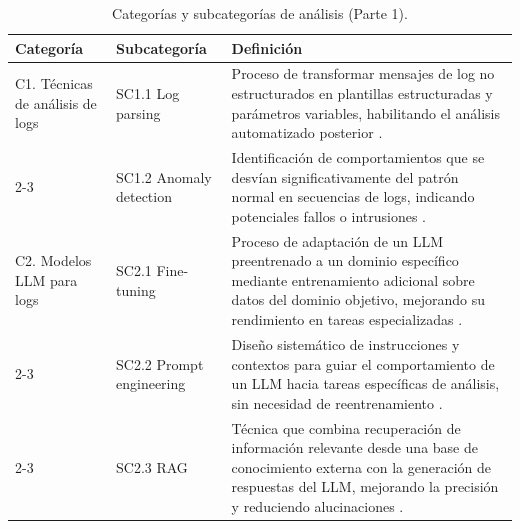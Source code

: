 \begin{table}[H]
\centering
\renewcommand{\arraystretch}{1.4}
\caption{Categorías y subcategorías de análisis (Parte 1).}
\renewcommand{\tablename}{Table}
\setlength{\arrayrulewidth}{1pt}
\begin{tabularx}{0.9\textwidth}{@{} p{2.8cm} p{3.2cm} X @{}}
\toprule
\hline
\textbf{Categoría} & \textbf{Subcategoría} & \textbf{Definición} \\
\hline
\midrule

C1. Técnicas de análisis de logs
& SC1.1 Log parsing
& Proceso de transformar mensajes de log no estructurados en plantillas
  estructuradas y parámetros variables, habilitando el análisis
  automatizado posterior \parencite{ma2024llmparser}. \\
\cline{2-3}
& SC1.2 Anomaly detection
& Identificación de comportamientos que se desvían significativamente
  del patrón normal en secuencias de logs, indicando potenciales
  fallos o intrusiones \parencite{almodovar2024logfit}. \\
\hline

C2. Modelos LLM para logs
& SC2.1 Fine-tuning
& Proceso de adaptación de un LLM preentrenado a un dominio específico
  mediante entrenamiento adicional sobre datos del dominio objetivo,
  mejorando su rendimiento en tareas especializadas
  \parencite{karlsen2023llm4sec}. \\
\cline{2-3}
& SC2.2 Prompt engineering
& Diseño sistemático de instrucciones y contextos para guiar el
  comportamiento de un LLM hacia tareas específicas de análisis,
  sin necesidad de reentrenamiento \parencite{liu2024logprompt}. \\
\cline{2-3}
& SC2.3 RAG
& Técnica que combina recuperación de información relevante desde una
  base de conocimiento externa con la generación de respuestas del LLM,
  mejorando la precisión y reduciendo alucinaciones
  \cite{blefari2026cyberrag}. \\

\bottomrule
\hline
\end{tabularx}
\label{tab:categorias_p1}
\end{table}

